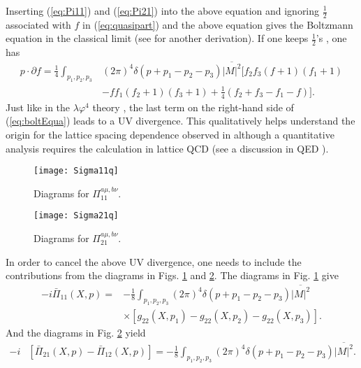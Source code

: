 \documentclass[onecolumn,showpacs,nobibnotes,nofootinbib,12pt,aps,prd,showpacs,notitlepage,nofootinbib,preprintnumbers,amsmath,amssymb]{article}
\begin{document}
Inserting (\ref{eq:Pi11}) and (\ref{eq:Pi21}) into the above equation
and ignoring $\frac{1}{2}$ associated with $f$ in (\ref{eq:quasipart})
and the above equation gives the Boltzmann equation in the classical
limit (see \cite{Mathieu:2014aba} for another derivation). If one
keeps $\frac{1}{2}$'s \cite{Mueller:2002gd}, one has
\begin{align}
  p\cdot \partial f=\frac{1}{4}\int_{p_1,p_2,p_3} &(2\pi)^4\delta(p+p_1-p_2-p_3)\overline{|M|^2}[f_2f_3(f+1)(f_1+1)\nonumber\\
  &-ff_1(f_2+1)(f_3+1)+\frac{1}{4}(f_2+f_3-f_1-f)].\label{eq:boltEqua}
\end{align}
Just like in the $\lambda\varphi^4$ theory \cite{Epelbaum:2014mfa},
the last term on the right-hand side of (\ref{eq:boltEqua}) leads to a UV
divergence. This qualitatively helps understand the origin for the
lattice spacing dependence observed in \cite{Gelis:2013rba} although a
quantitative analysis requires the calculation in lattice QCD (see a
discussion in QED \cite{Epelbaum:2015cca,Epelbaum:2015vaa}).


\begin{figure}
\begin{center}
\texttt{[image: Sigma11q]}
\end{center}
\caption{Diagrams for $\Pi_{11}^{a\mu,b\nu}$.}
\label{fig:Pi11q}
\end{figure}


\begin{figure}
\begin{center}
\texttt{[image: Sigma21q]}
\end{center}
\caption{Diagrams for $\Pi_{21}^{a\mu,b\nu}$.}
\label{fig:Pi21q}
\end{figure}


In order to cancel the above UV divergence, one needs to include the
contributions from the diagrams in Figs. \ref{fig:Pi11q} and
\ref{fig:Pi21q}. The diagrams in Fig. \ref{fig:Pi11q} give
\begin{align}
  -i\bar\Pi_{11}(X,p)=&-\frac{1}{8}\int_{p_1,p_2,p_3} (2\pi)^4\delta(p+p_1-p_2-p_3)\overline{|M|^2} \nonumber\\
  &\times[ g_{22}(X,p_1)-g_{22}(X,p_2)-g_{22}(X,p_3)].\label{eq:Pi11q}
\end{align}
And the diagrams in Fig. \ref{fig:Pi21q} yield
\begin{align}
  -i&[\bar\Pi_{21}(X,p)-\bar\Pi_{12}(X,p)]=-\frac{1}{8}\int_{p_1,p_2,p_3} (2\pi)^4\delta(p+p_1-p_2-p_3)\overline{|M|^2}.\label{eq:Pi21q}
\end{align}
\end{document}
